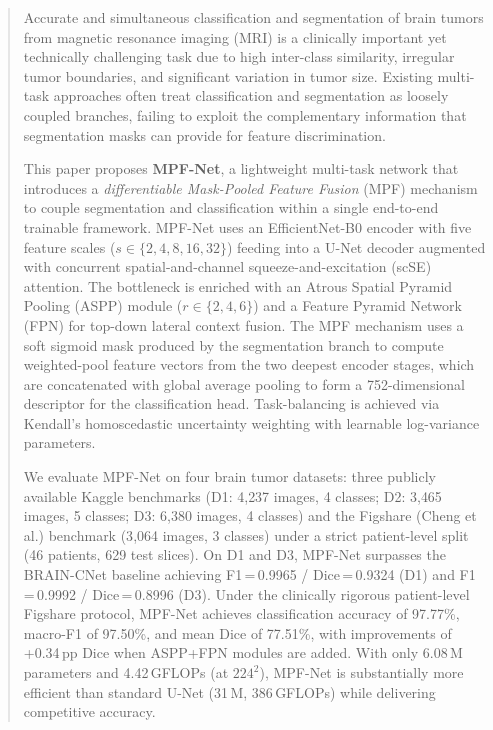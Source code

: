 \documentclass[journal]{IEEEtran}
\begin{document}
\begin{abstract}
Accurate and simultaneous classification and segmentation of brain tumors
from magnetic resonance imaging (MRI) is a clinically important yet
technically challenging task due to high inter-class similarity, irregular
tumor boundaries, and significant variation in tumor size. Existing
multi-task approaches often treat classification and segmentation as
loosely coupled branches, failing to exploit the complementary information
that segmentation masks can provide for feature discrimination.

This paper proposes \textbf{MPF-Net}, a lightweight multi-task network that
introduces a \emph{differentiable Mask-Pooled Feature Fusion} (MPF) mechanism
to couple segmentation and classification within a single end-to-end
trainable framework. MPF-Net uses an EfficientNet-B0 encoder with five
feature scales ($s \in \{2,4,8,16,32\}$) feeding into a U-Net decoder
augmented with concurrent spatial-and-channel squeeze-and-excitation (scSE)
attention. The bottleneck is enriched with an Atrous Spatial Pyramid Pooling
(ASPP) module ($r \in \{2,4,6\}$) and a Feature Pyramid Network (FPN) for
top-down lateral context fusion. The MPF mechanism uses a soft sigmoid mask
produced by the segmentation branch to compute weighted-pool feature vectors
from the two deepest encoder stages, which are concatenated with global
average pooling to form a 752-dimensional descriptor for the classification
head. Task-balancing is achieved via Kendall's homoscedastic uncertainty
weighting with learnable log-variance parameters.

We evaluate MPF-Net on four brain tumor datasets: three publicly available
Kaggle benchmarks (D1: 4{,}237 images, 4 classes; D2: 3{,}465 images, 5
classes; D3: 6{,}380 images, 4 classes) and the Figshare (Cheng et al.)
benchmark (3{,}064 images, 3 classes) under a strict patient-level split
(46 patients, 629 test slices). On D1 and D3, MPF-Net surpasses the
BRAIN-CNet baseline achieving F1\,=\,0.9965 / Dice\,=\,0.9324 (D1) and
F1\,=\,0.9992 / Dice\,=\,0.8996 (D3). Under the clinically rigorous
patient-level Figshare protocol, MPF-Net achieves classification accuracy
of 97.77\%, macro-F1 of 97.50\%, and mean Dice of 77.51\%, with improvements
of +0.34\,pp Dice when ASPP+FPN modules are added. With only 6.08\,M
parameters and 4.42\,GFLOPs (at $224^2$), MPF-Net is substantially more
efficient than standard U-Net (31\,M, 386\,GFLOPs) while delivering
competitive accuracy.
\end{abstract}
\end{document}
